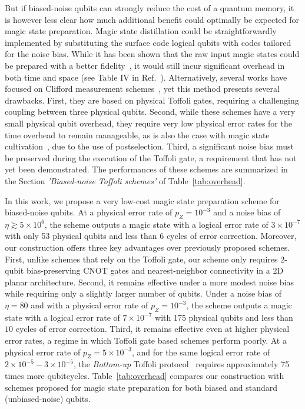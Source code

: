 \documentclass[%
 reprint,
superscriptaddress,
 amsmath,amssymb,
 aps,
]{revtex4-2}
\begin{document}
But if biased-noise qubits can strongly reduce the cost of a quantum memory, it is however less clear how much additional benefit could optimally be expected for magic state preparation. Magic state distillation could be straightforwardly implemented by substituting the surface code logical qubits with codes tailored for the noise bias. While it has been shown that the raw input magic states could be prepared with a better fidelity~\cite{singh2022high}, it would still incur significant overhead in both time and space (see Table IV in Ref.~\cite{chamberland2022building}). Alternatively, several works have focused on Clifford measurement schemes~\cite{chamberland2022building,gouzien2023performance}, yet this method presents several drawbacks. First, they are based on physical Toffoli gates, requiring a challenging coupling between three physical qubits. Second, while these schemes have a very small physical qubit overhead, they require very low physical error rates for the time overhead to remain manageable, as is also the case with magic state cultivation~\cite{gidney2024magic}, due to the use of postselection. Third, a significant noise bias must be preserved during the execution of the Toffoli gate, a requirement that has not yet been demonstrated. The performances of these schemes are summarized in the Section \textit{'Biased-noise Toffoli schemes'} of Table~\ref{tab:overhead}.

In this work, we propose a very low-cost magic state preparation scheme for biased-noise qubits. At a physical error rate of $p_Z = 10^{-3}$ and a noise bias of $\eta \gtrsim 5 \times 10^6$, the scheme outputs a magic state with a logical error rate of $3 \times 10^{-7}$ with only 53 physical qubits and less than $6$ cycles of error correction. Moreover, our construction offers three key advantages over previously proposed schemes. First, unlike schemes that rely on the Toffoli gate, our scheme only requires 2-qubit bias-preserving CNOT gates and nearest-neighbor connectivity in a 2D planar architecture. Second, it remains effective under a more modest noise bias while requiring only a slightly larger number of qubits. Under a noise bias of $\eta = 80$ and with a physical error rate of $p_Z = 10^{-3}$, the scheme outputs a magic state with a logical error rate of $7 \times 10^{-7}$ with 175 physical qubits and less than $10$ cycles of error correction. Third, it remains effective even at higher physical error rates, a regime in which Toffoli gate based schemes perform poorly. At a physical error rate of $p_Z = 5 \times 10^{-3}$, and for the same logical error rate of $2\times 10^{-5} - 3\times 10^{-5}$, the \textit{Bottom-up} Toffoli protocol~\cite{chamberland2022building,gouzien2023performance} requires approximately 75 times more qubitcycles. Table~\ref{tab:overhead} compares our construction with schemes proposed for magic state preparation for both biased and standard (unbiased-noise) qubits.
\end{document}
